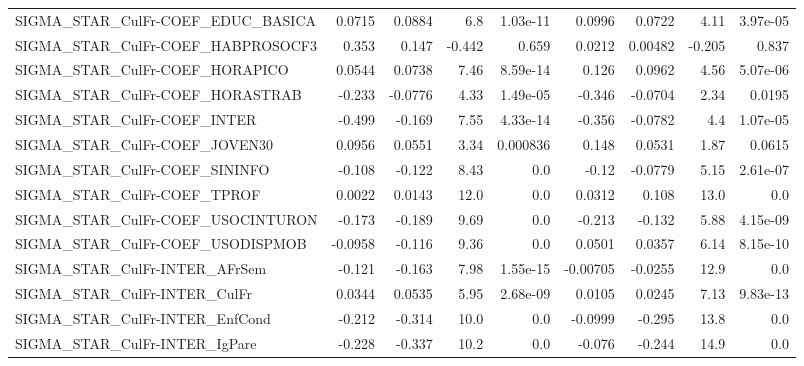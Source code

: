 \begin{tabular}{lrrrrrrrr}
SIGMA\_STAR\_CulFr-COEF\_EDUC\_BASICA     &      0.0715 &       0.0884 &     6.8 & 1.03e-11 &     0.0996 &      0.0722 &         4.11 &      3.97e-05 \\
SIGMA\_STAR\_CulFr-COEF\_HABPROSOCF3     &       0.353 &        0.147 &  -0.442 &    0.659 &     0.0212 &     0.00482 &       -0.205 &         0.837 \\
SIGMA\_STAR\_CulFr-COEF\_HORAPICO        &      0.0544 &       0.0738 &    7.46 & 8.59e-14 &      0.126 &      0.0962 &         4.56 &      5.07e-06 \\
SIGMA\_STAR\_CulFr-COEF\_HORASTRAB       &      -0.233 &      -0.0776 &    4.33 & 1.49e-05 &     -0.346 &     -0.0704 &         2.34 &        0.0195 \\
SIGMA\_STAR\_CulFr-COEF\_INTER           &      -0.499 &       -0.169 &    7.55 & 4.33e-14 &     -0.356 &     -0.0782 &          4.4 &      1.07e-05 \\
SIGMA\_STAR\_CulFr-COEF\_JOVEN30         &      0.0956 &       0.0551 &    3.34 & 0.000836 &      0.148 &      0.0531 &         1.87 &        0.0615 \\
SIGMA\_STAR\_CulFr-COEF\_SININFO         &      -0.108 &       -0.122 &    8.43 &      0.0 &      -0.12 &     -0.0779 &         5.15 &      2.61e-07 \\
SIGMA\_STAR\_CulFr-COEF\_TPROF           &      0.0022 &       0.0143 &    12.0 &      0.0 &     0.0312 &       0.108 &         13.0 &           0.0 \\
SIGMA\_STAR\_CulFr-COEF\_USOCINTURON     &      -0.173 &       -0.189 &    9.69 &      0.0 &     -0.213 &      -0.132 &         5.88 &      4.15e-09 \\
SIGMA\_STAR\_CulFr-COEF\_USODISPMOB      &     -0.0958 &       -0.116 &    9.36 &      0.0 &     0.0501 &      0.0357 &         6.14 &      8.15e-10 \\
SIGMA\_STAR\_CulFr-INTER\_AFrSem         &      -0.121 &       -0.163 &    7.98 & 1.55e-15 &   -0.00705 &     -0.0255 &         12.9 &           0.0 \\
SIGMA\_STAR\_CulFr-INTER\_CulFr          &      0.0344 &       0.0535 &    5.95 & 2.68e-09 &     0.0105 &      0.0245 &         7.13 &      9.83e-13 \\
SIGMA\_STAR\_CulFr-INTER\_EnfCond        &      -0.212 &       -0.314 &    10.0 &      0.0 &    -0.0999 &      -0.295 &         13.8 &           0.0 \\
SIGMA\_STAR\_CulFr-INTER\_IgPare         &      -0.228 &       -0.337 &    10.2 &      0.0 &     -0.076 &      -0.244 &         14.9 &           0.0 \\

\end{tabular}
